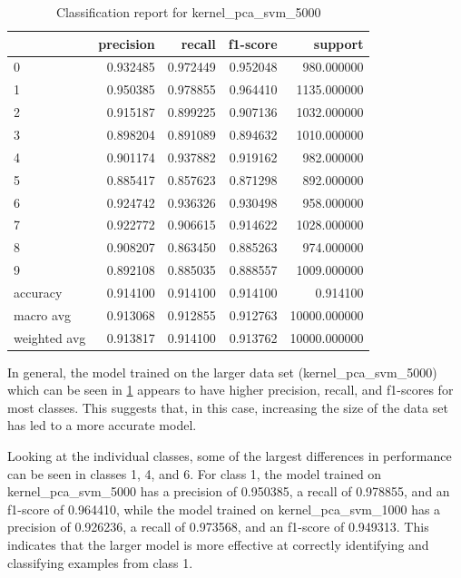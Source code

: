 \begin{table}[htb!]
    \centering
    \begin{tabular}{lrrrr}
        \toprule
        & precision & recall & f1-score & support \\
        \midrule
        0 & 0.932485 & 0.972449 & 0.952048 & 980.000000 \\
        1 & 0.950385 & 0.978855 & 0.964410 & 1135.000000 \\
        2 & 0.915187 & 0.899225 & 0.907136 & 1032.000000 \\
        3 & 0.898204 & 0.891089 & 0.894632 & 1010.000000 \\
        4 & 0.901174 & 0.937882 & 0.919162 & 982.000000 \\
        5 & 0.885417 & 0.857623 & 0.871298 & 892.000000 \\
        6 & 0.924742 & 0.936326 & 0.930498 & 958.000000 \\
        7 & 0.922772 & 0.906615 & 0.914622 & 1028.000000 \\
        8 & 0.908207 & 0.863450 & 0.885263 & 974.000000 \\
        9 & 0.892108 & 0.885035 & 0.888557 & 1009.000000 \\
        accuracy & 0.914100 & 0.914100 & 0.914100 & 0.914100 \\
        macro avg & 0.913068 & 0.912855 & 0.912763 & 10000.000000 \\
        weighted avg & 0.913817 & 0.914100 & 0.913762 & 10000.000000 \\
        \bottomrule
    \end{tabular}
    \caption{Classification report for kernel\_pca\_svm\_5000}
    \label{tab:classification-report-kernel_pca_svm_5000}
\end{table}

In general, the model trained on the larger data set (kernel\_pca\_svm\_5000) which can be seen in \ref{tab:classification-report-kernel_pca_svm_5000} appears to have higher precision, recall, and f1-scores for most classes. This suggests that, in this case, increasing the size of the data set has led to a more accurate model.

Looking at the individual classes, some of the largest differences in performance can be seen in classes 1, 4, and 6. For class 1, the model trained on kernel\_pca\_svm\_5000 has a precision of 0.950385, a recall of 0.978855, and an f1-score of 0.964410, while the model trained on kernel\_pca\_svm\_1000 has a precision of 0.926236, a recall of 0.973568, and an f1-score of 0.949313. This indicates that the larger model is more effective at correctly identifying and classifying examples from class 1.

